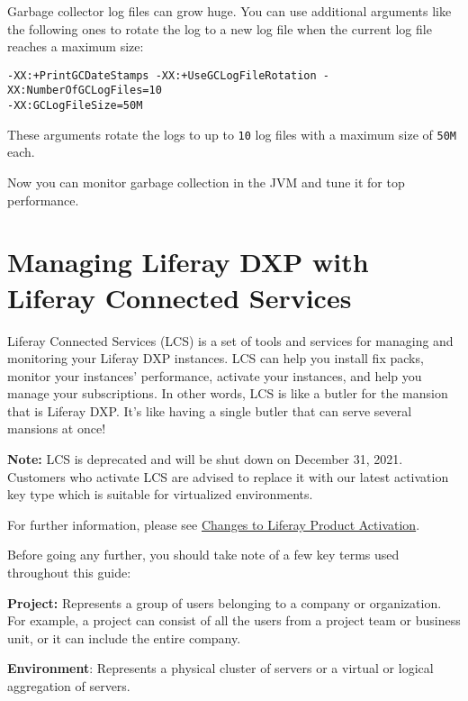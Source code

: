 \noindent\hrulefill

Garbage collector log files can grow huge. You can use additional
arguments like the following ones to rotate the log to a new log file
when the current log file reaches a maximum size:

\begin{verbatim}
-XX:+PrintGCDateStamps -XX:+UseGCLogFileRotation -XX:NumberOfGCLogFiles=10 
-XX:GCLogFileSize=50M
\end{verbatim}

These arguments rotate the logs to up to \texttt{10} log files with a
maximum size of \texttt{50M} each.

Now you can monitor garbage collection in the JVM and tune it for top
performance.

\chapter{Managing Liferay DXP with Liferay Connected
Services}\label{managing-liferay-dxp-with-liferay-connected-services}

Liferay Connected Services (LCS) is a set of tools and services for
managing and monitoring your Liferay DXP instances. LCS can help you
install fix packs, monitor your instances' performance, activate your
instances, and help you manage your subscriptions. In other words, LCS
is like a butler for the mansion that is Liferay DXP. It's like having a
single butler that can serve several mansions at once!

\noindent\hrulefill

\textbf{Note:} LCS is deprecated and will be shut down on December 31,
2021. Customers who activate LCS are advised to replace it with our
latest activation key type which is suitable for virtualized
environments.

For further information, please see
\href{https://help.liferay.com/hc/en-us/articles/4402347960845-Changes-to-Liferay-Product-Activation}{Changes
to Liferay Product Activation}.

\noindent\hrulefill

Before going any further, you should take note of a few key terms used
throughout this guide:

\textbf{Project:} Represents a group of users belonging to a company or
organization. For example, a project can consist of all the users from a
project team or business unit, or it can include the entire company.

\textbf{Environment}: Represents a physical cluster of servers or a
virtual or logical aggregation of servers.

